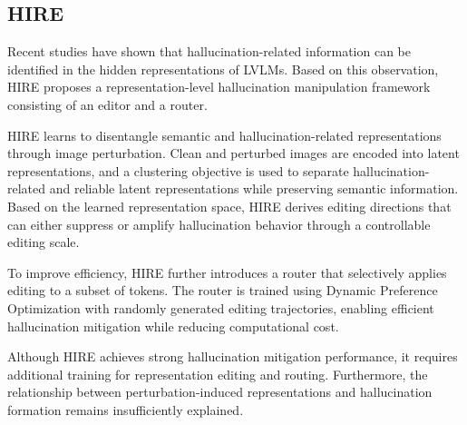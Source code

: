 \subsection{HIRE}

Recent studies have shown that hallucination-related information can be identified in the hidden representations of LVLMs. Based on this observation, HIRE \citep{suo2026hallucination} proposes a representation-level hallucination manipulation framework consisting of an editor and a router.

HIRE learns to disentangle semantic and hallucination-related representations through image perturbation. Clean and perturbed images are encoded into latent representations, and a clustering objective is used to separate hallucination-related and reliable latent representations while preserving semantic information. Based on the learned representation space, HIRE derives editing directions that can either suppress or amplify hallucination behavior through a controllable editing scale.

To improve efficiency, HIRE further introduces a router that selectively applies editing to a subset of tokens. The router is trained using Dynamic Preference Optimization with randomly generated editing trajectories, enabling efficient hallucination mitigation while reducing computational cost.

Although HIRE achieves strong hallucination mitigation performance, it requires additional training for representation editing and routing. Furthermore, the relationship between perturbation-induced representations and hallucination formation remains insufficiently explained.

